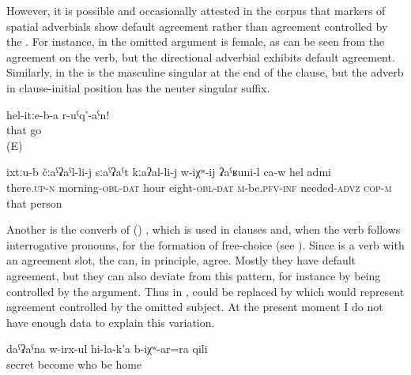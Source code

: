 However, it is possible and occasionally attested in the corpus that  markers of spatial adverbials show default agreement rather than agreement controlled by the . For instance, in  the omitted  argument is female, as can be seen from the agreement on the verb, but the directional adverbial exhibits default agreement. Similarly, in  the  is the masculine singular  at the end of the clause, but the adverb in clause-initial position has the neuter  singular suffix. 
%
\begin{exe}
	\ex	\label{ex:‎‎‎Go like that (i.e. in that direction)}
	\gll	hel-itːe-b-a	r-uˁq'-aˁn!\\
		that	go\\
	\glt	{} (E)
	
			\ex	\label{ex:This person needs to be there in the morning at 8 o'clockAA}
		\gll	ixtːu-b	čːaˁʡaˁl-li-j	sːaˁʡaˁt	kːaʔal-li-j	w-iχʷ-ij	ʡaˁʁuni-l	ca-w	hel	admi \\
			there.\textsc{up}-\textsc{n}	morning-\textsc{obl}-\textsc{dat} hour	eight-\textsc{obl}-\textsc{dat}	\textsc{m}-be.\textsc{pfv}-\textsc{inf} needed-\textsc{advz}	\textsc{cop-m} that person\\
		\glt	{}	
		
\end{exe}

Another  is the  converb of  () , which is used in  clauses and, when the verb follows interrogative pronouns, for the formation of free-choice  (see ). Since  is a verb with an agreement slot, the  can, in principle, agree. Mostly they have default agreement, but they can also deviate from this pattern, for instance by being controlled by the  argument. Thus in ,  could be replaced by  which would represent agreement controlled by the omitted  subject. At the present moment I do not have enough data to explain this variation.  
%
\begin{exe}
	\ex	\label{ex:(he was) hiding at the house of whomever}
	\gll	daˁʡaˁna	w-irx-ul	hi-la-k'a	b-iχʷ-ar=ra	qili\\
		secret	become	who	be	home\\
	\glt	{}
\end{exe}


